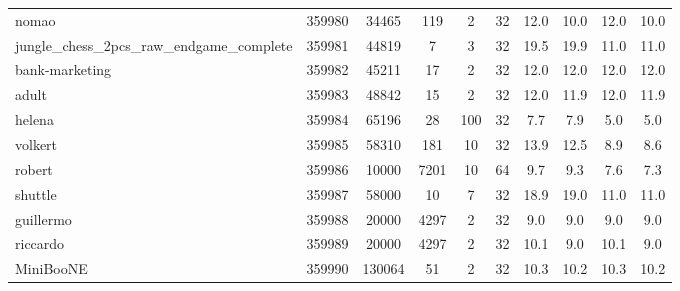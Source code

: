 \documentclass[11pt]{article}
\begin{document}
\begin{table}[H]
{\begin{tabular}{@{}lccccc|cc|cc@{}}
nomao                                       & 359980         & 34465       & 119        & 2         & 32          & 12.0                     & 10.0          & 12.0                        & 10.0              \\
jungle\_chess\_2pcs\_raw\_endgame\_complete & 359981         & 44819       & 7          & 3         & 32          & 19.5                     & 19.9          & 11.0                        & 11.0              \\
bank-marketing                              & 359982         & 45211       & 17         & 2         & 32          & 12.0                     & 12.0          & 12.0                        & 12.0              \\
adult                                       & 359983         & 48842       & 15         & 2         & 32          & 12.0                     & 11.9          & 12.0                        & 11.9              \\
helena                                      & 359984         & 65196       & 28         & 100       & 32          & 7.7                      & 7.9           & 5.0                         & 5.0               \\
volkert                                     & 359985         & 58310       & 181        & 10        & 32          & 13.9                     & 12.5          & 8.9                         & 8.6               \\
robert                                      & 359986         & 10000       & 7201       & 10        & 64          & 9.7                      & 9.3           & 7.6                         & 7.3               \\
shuttle                                     & 359987         & 58000       & 10         & 7         & 32          & 18.9                     & 19.0          & 11.0                        & 11.0              \\
guillermo                                   & 359988         & 20000       & 4297       & 2         & 32          & 9.0                      & 9.0           & 9.0                         & 9.0               \\
riccardo                                    & 359989         & 20000       & 4297       & 2         & 32          & 10.1                     & 9.0           & 10.1                        & 9.0               \\
MiniBooNE                                   & 359990         & 130064      & 51         & 2         & 32          & 10.3                     & 10.2          & 10.3                        & 10.2              \\

\end{tabular}}
\end{table}
\end{document}
